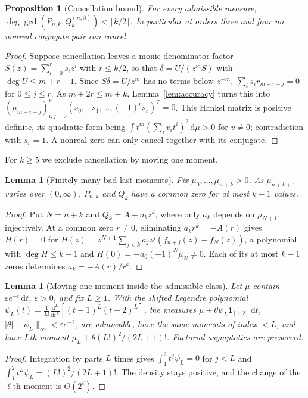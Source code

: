 \documentclass[11pt,a4paper]{article}
\newtheorem{proposition}[theorem]{Proposition}
\newtheorem{lemma}[theorem]{Lemma}
\theoremstyle{definition}
\theoremstyle{remark}
\newcommand{\dd}{\,\mathrm{d}}
\begin{document}
\begin{proposition}[Cancellation bound]\label{prop:noncancellation}
For every admissible measure,
$\deg\gcd(P_{n,k},Q_k^{(n,\beta)})<\lceil k/2\rceil$. In particular at
orders three and four no nonreal conjugate pair can cancel.
\end{proposition}
\begin{proof}
Suppose cancellation leaves a monic denominator factor $S(z)=\sum_{i=0}^r
s_iz^i$ with $r\le k/2$, so that $\delta=U/(z^mS)$ with $\deg U\le m+r-1$.
Since $S\delta=U/z^m$ has no terms below $z^{-m}$,
$\sum_is_ir_{m+i+j}=0$ for $0\le j\le r$. As $m+2r\le m+k$,
Lemma~\ref{lem:accuracy} turns this into
$(\mu_{m+i+j})_{i,j=0}^r(s_0,-s_1,\dots,(-1)^rs_r)^T=0$. This Hankel matrix
is positive definite, its quadratic form being
$\int t^m(\sum_iv_it^i)^2\dd\mu>0$ for $v\ne0$; contradiction with $s_r=1$.
A nonreal zero can only cancel together with its conjugate.
\end{proof}

For $k\ge5$ we exclude cancellation by moving one moment.

\begin{lemma}[Finitely many bad last moments]\label{lem:exceptional}
Fix $\mu_0,\dots,\mu_{n+k}>0$. As $\mu_{n+k+1}$ varies over $(0,\infty)$,
$P_{n,k}$ and $Q_k$ have a common zero for at most $k-1$ values.
\end{lemma}
\begin{proof}
Put $N=n+k$ and $Q_k=A+a_kz^k$, where only $a_k$ depends on $\mu_{N+1}$,
injectively. At a common zero $r\ne0$, eliminating $a_kr^k=-A(r)$ gives
$H(r)=0$ for $H(z)=z^{N+1}\sum_{j<k}a_jz^j(f_{n+j}(z)-f_N(z))$, a polynomial
with $\deg H\le k-1$ and $H(0)=-a_0(-1)^N\mu_N\ne0$. Each of its at most
$k-1$ zeros determines $a_k=-A(r)/r^k$.
\end{proof}

\begin{lemma}[Moving one moment inside the admissible class]\label{lem:momentperturbation}
Let $\mu$ contain $\varepsilon e^{-t}\dd t$, $\varepsilon>0$, and fix $L\ge1$.
With the shifted Legendre polynomial
$\psi_L(t)=\frac1{L!}\frac{\mathrm d^L}{\mathrm dt^L}[(t-1)^L(t-2)^L]$,
the measures $\mu+\theta\psi_L\mathbf 1_{[1,2]}\dd t$,
$|\theta|\,\|\psi_L\|_\infty<\varepsilon e^{-2}$, are admissible, have the
same moments of index $<L$, and have $L$th moment
$\mu_L+\theta(L!)^2/(2L+1)!$. Factorial asymptotics are preserved.
\end{lemma}
\begin{proof}
Integration by parts $L$ times gives $\int_1^2t^j\psi_L=0$ for $j<L$ and
$\int_1^2t^L\psi_L=(L!)^2/(2L+1)!$. The density stays positive, and the
change of the $\ell$th moment is $O(2^\ell)$.
\end{proof}
\end{document}
